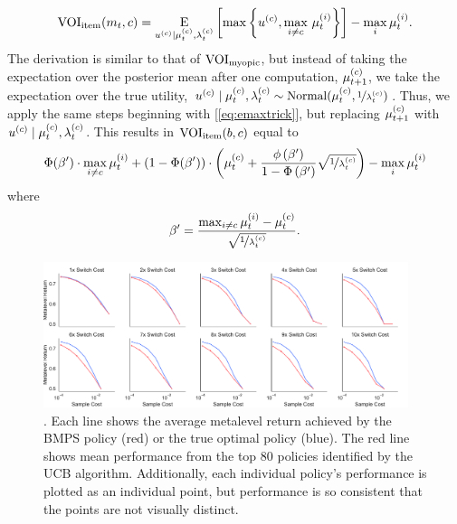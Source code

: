 \begin{equation}
  \text{VOI}_\text{item}(m_t,c)=\operatorname*{E}_{u^{(c)} \mid \mu_{t}^{(c)}, \lambda_{t}^{(c)}} \left[
    \max \left\{ u^{(c)},\max_{i\neq c}\,\mu_t^{(i)} \right\}
  \right] -\max_{i}\mu_t^{(i)}.
\end{equation}
%
The derivation is similar to that of $\text{VOI}_\text{myopic}$, but instead of taking the expectation over the posterior mean after one computation, $\mu_{t+1}^{(c)}$, we take the expectation over the true utility, $u^{(c)} \mid \mu_{t}^{(c)}, \lambda_{t}^{(c)} \sim \mathrm{Normal}(\mu_{t}^{(c)},\nicefrac{1}{\lambda_{t}^{(c)}})$. Thus, we apply the same steps beginning with [\ref{eq:emaxtrick}], but replacing $\mu_{t+1}^{(c)}$ with $u^{(c)} \mid \mu_{t}^{(c)}, \lambda_{t}^{(c)}$. This results in $\text{VOI}_\text{item}(b, c)$ equal to
%
%
\begin{equation}
  \Phi(\beta')\cdot\max_{i\neq c}\mu_t^{(i)}+\left(1-\Phi(\beta')\right)\cdot\left(\mu_{t}^{(c)}+\frac{\phi\left(\beta'\right)}{1-\Phi\left(\beta'\right)}
  \sqrt{\nicefrac{1}{\lambda_{t}^{(c)}}}\right)
  - \max_{i}\mu_t^{(i)}
\end{equation}
%
where 
%
\begin{equation}
  \beta'=\frac{\max_{i\neq c}\mu_t^{(i)}-\mu_{t}^{(c)}}{\sqrt{\nicefrac{1}{\lambda_{t}^{(c)}}}}.
\end{equation}
%


\begin{figure}[b!]
  
  \centering
  \includegraphics[width=0.95\textwidth]{figs/attention/supp-bernoulli.pdf}
  \caption{.
    Each line shows the average metalevel return achieved by the BMPS policy (red) or the true optimal policy (blue). The red line shows mean performance from the top 80 policies identified by the UCB algorithm. Additionally, each individual policy's performance is plotted as an individual point, but performance is so consistent that the points are not visually distinct.}
  \label{fig:attention-bernoulli}
  
\end{figure}  %

